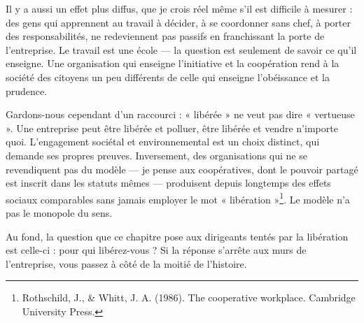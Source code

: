 Il y a aussi un effet plus diffus, que je crois réel même s'il est difficile à mesurer : des gens qui apprennent au travail à décider, à se coordonner sans chef, à porter des responsabilités, ne redeviennent pas passifs en franchissant la porte de l'entreprise. Le travail est une école — la question est seulement de savoir ce qu'il enseigne. Une organisation qui enseigne l'initiative et la coopération rend à la société des citoyens un peu différents de celle qui enseigne l'obéissance et la prudence.

Gardons-nous cependant d'un raccourci : « libérée » ne veut pas dire « vertueuse ». Une entreprise peut être libérée et polluer, être libérée et vendre n'importe quoi. L'engagement sociétal et environnemental est un choix distinct, qui demande ses propres preuves. Inversement, des organisations qui ne se revendiquent pas du modèle — je pense aux coopératives, dont le pouvoir partagé est inscrit dans les statuts mêmes — produisent depuis longtemps des effets sociaux comparables sans jamais employer le mot « libération »\footnote{Rothschild, J., \& Whitt, J. A. (1986). The cooperative workplace. Cambridge University Press.}. Le modèle n'a pas le monopole du sens.

Au fond, la question que ce chapitre pose aux dirigeants tentés par la libération est celle-ci : pour qui libérez-vous ? Si la réponse s'arrête aux murs de l'entreprise, vous passez à côté de la moitié de l'histoire.
